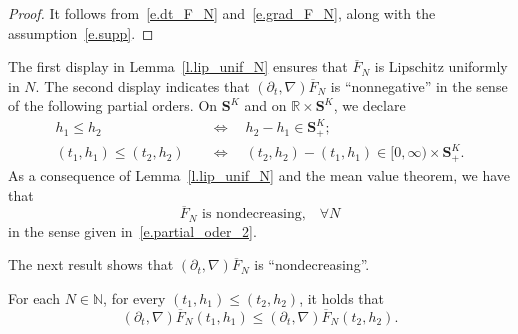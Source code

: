 \documentclass[AHL,Unicode,longabstracts,published]{cedram}
\newcommand{\N}{\mathbb{N}}
\newcommand{\R}{\mathbb{R}}
\renewcommand{\S}{\mathbf{S}}
\renewcommand{\leq}{\leqslant}
\renewcommand{\bar}{\overline}
\let\oldforall\forall
\renewcommand*{\forall}{\mathrel{\oldforall}}
\begin{document}
\begin{proof}
It follows from~\eqref{e.dt_F_N} and~\eqref{e.grad_F_N}, along with the assumption~\eqref{e.supp}.
\end{proof}


The first display in Lemma~\ref{l.lip_unif_N} ensures that $\bar F_N$ is Lipschitz uniformly in $N$. The second display indicates that $(\partial_t, \nabla)\bar F_N$ is ``nonnegative'' in the sense of the following partial orders. On $\S^K$ and on $\R\times \S^K$, we declare
\begin{align}
h_1 \leq h_2 \quad&\Longleftrightarrow\quad h_2 - h_1 \in \S^K_+;\label{e.partial_oder_1}
\\
\left(t_1, h_1\right)\leq \left(t_2,h_2\right) \quad&\Longleftrightarrow\quad \left(t_2,h_2\right)-\left(t_1, h_1\right)\in [0,\infty)\times \S^K_+.\label{e.partial_oder_2}
\end{align}
{As a consequence of Lemma~\ref{l.lip_unif_N} and the mean value theorem, we have that
\begin{equation}\label{e.bar_F_nondec}
\bar F_N\text{ is nondecreasing,}\quad\forall N
\end{equation}
in the sense given in~\eqref{e.partial_oder_2}.}

The next result shows that $(\partial_t, \nabla)\bar F_N$ is ``nondecreasing''.



\begin{lemm}\label{l.F_N.order}
For each $N\in\N$, for every $(t_1,h_1)\leq (t_2,h_2)$, it holds that
\begin{equation*}
\left(\partial_t,\nabla\right)\bar F_N \left(t_1,h_1\right)\leq \left(\partial_t,\nabla\right)\bar F_N\left(t_2,h_2\right).
\end{equation*}
\end{lemm}
\end{document}
